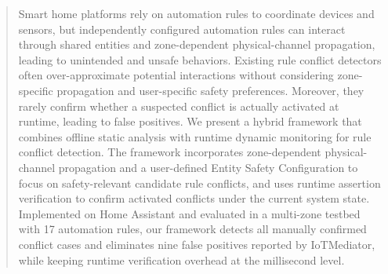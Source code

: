 \begin{abstract}

Smart home platforms rely on automation rules to coordinate devices and sensors, but independently configured automation rules can interact through shared entities and zone-dependent physical-channel propagation, leading to unintended and unsafe behaviors. Existing rule conflict detectors often over-approximate potential interactions without considering zone-specific propagation and user-specific safety preferences. Moreover, they rarely confirm whether a suspected conflict is actually activated at runtime, leading to false positives. We present a hybrid framework that combines offline static analysis with runtime dynamic monitoring for rule conflict detection. The framework incorporates zone-dependent physical-channel propagation and a user-defined Entity Safety Configuration to focus on safety-relevant candidate rule conflicts, and uses runtime assertion verification to confirm activated conflicts under the current system state. Implemented on Home Assistant and evaluated in a multi-zone testbed with 17 automation rules, our framework detects all manually confirmed conflict cases and eliminates nine false positives reported by IoTMediator, while keeping runtime verification overhead at the millisecond level.


\end{abstract}